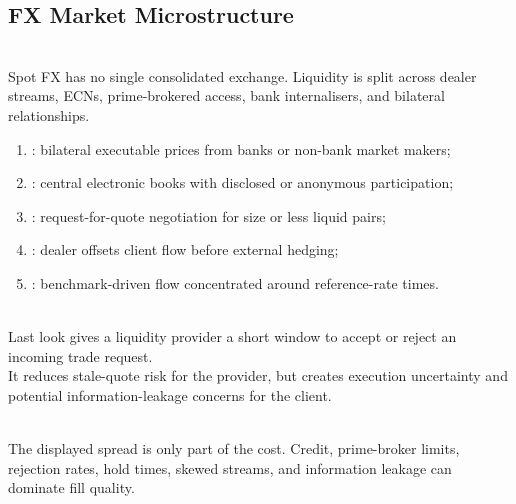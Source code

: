 \subsection{FX Market Microstructure}

\begin{principle} \\
Spot FX has no single consolidated exchange. Liquidity is split across dealer streams, ECNs, prime-brokered access, bank internalisers, and bilateral relationships.
\end{principle}

\begin{taxonomy} 
\begin{enumerate}[label=\roman*.]
\setlength{\itemsep}{0pt}
\item {}: bilateral executable prices from banks or non-bank market makers;
\item {}: central electronic books with disclosed or anonymous participation;
\item {}: request-for-quote negotiation for size or less liquid pairs;
\item {}: dealer offsets client flow before external hedging;
\item {}: benchmark-driven flow concentrated around reference-rate times.
\end{enumerate}
\end{taxonomy}

\begin{definition} \\
Last look gives a liquidity provider a short window to accept or reject an incoming trade request.\\
It reduces stale-quote risk for the provider, but creates execution uncertainty and potential information-leakage concerns for the client.
\end{definition}

\begin{caveat} \\
The displayed spread is only part of the cost. Credit, prime-broker limits, rejection rates, hold times, skewed streams, and information leakage can dominate fill quality.
\end{caveat}
